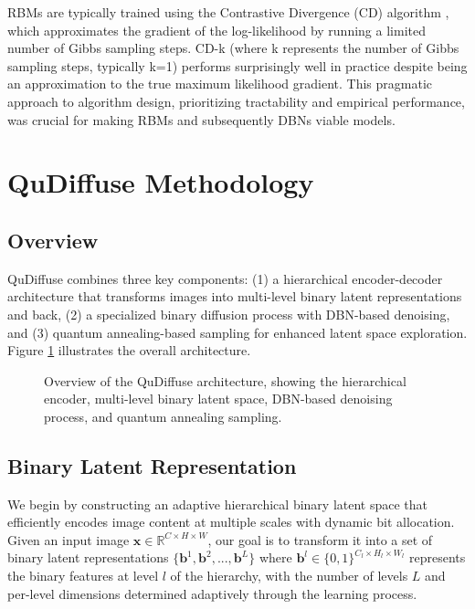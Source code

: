 \documentclass[10pt,twocolumn,letterpaper]{article}
\newcommand{\bm}[1]{\boldsymbol{#1}}
\newcommand{\binary}{\bm{b}}
\newcommand{\img}{\bm{x}}
\newcommand{\R}{\mathbb{R}}
\begin{document}
RBMs are typically trained using the Contrastive Divergence (CD) algorithm \cite{hinton2002training}, which approximates the gradient of the log-likelihood by running a limited number of Gibbs sampling steps. CD-k (where k represents the number of Gibbs sampling steps, typically k=1) performs surprisingly well in practice despite being an approximation to the true maximum likelihood gradient. This pragmatic approach to algorithm design, prioritizing tractability and empirical performance, was crucial for making RBMs and subsequently DBNs viable models.

\section{QuDiffuse Methodology}
\label{sec:method}

\subsection{Overview}
QuDiffuse combines three key components: (1) a hierarchical encoder-decoder architecture that transforms images into multi-level binary latent representations and back, (2) a specialized binary diffusion process with DBN-based denoising, and (3) quantum annealing-based sampling for enhanced latent space exploration. Figure \ref{fig:overview} illustrates the overall architecture.

\begin{figure}[t]
    \centering
    \caption{Overview of the QuDiffuse architecture, showing the hierarchical encoder, multi-level binary latent space, DBN-based denoising process, and quantum annealing sampling.}
    \label{fig:overview}
\end{figure}

\subsection{Binary Latent Representation}
\label{sec:binary_latent}

We begin by constructing an adaptive hierarchical binary latent space that efficiently encodes image content at multiple scales with dynamic bit allocation. Given an input image $\img \in \R^{C \times H \times W}$, our goal is to transform it into a set of binary latent representations $\{\binary^1, \binary^2, ..., \binary^L\}$ where $\binary^l \in \{0,1\}^{C_l \times H_l \times W_l}$ represents the binary features at level $l$ of the hierarchy, with the number of levels $L$ and per-level dimensions determined adaptively through the learning process.
\end{document}
